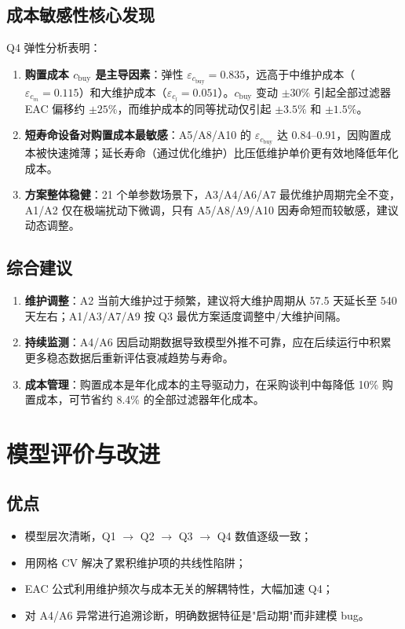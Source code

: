 \documentclass[12pt, a4paper, fontset=fandol]{ctexart}
\theoremstyle{definition}
\begin{document}
\subsection{成本敏感性核心发现}

Q4 弹性分析表明：
\begin{enumerate}[leftmargin=2em]
  \item \textbf{购置成本 $c_{\text{buy}}$ 是主导因素}：弹性 $\varepsilon_{c_{\text{buy}}}=0.835$，远高于中维护成本（$\varepsilon_{c_m}=0.115$）和大维护成本（$\varepsilon_{c_l}=0.051$）。$c_{\text{buy}}$ 变动 $\pm 30\%$ 引起全部过滤器 EAC 偏移约 $\pm 25\%$，而维护成本的同等扰动仅引起 $\pm 3.5\%$ 和 $\pm 1.5\%$。
  \item \textbf{短寿命设备对购置成本最敏感}：A5/A8/A10 的 $\varepsilon_{c_{\text{buy}}}$ 达 0.84--0.91，因购置成本被快速摊薄；延长寿命（通过优化维护）比压低维护单价更有效地降低年化成本。
  \item \textbf{方案整体稳健}：21 个单参数场景下，A3/A4/A6/A7 最优维护周期完全不变，A1/A2 仅在极端扰动下微调，只有 A5/A8/A9/A10 因寿命短而较敏感，建议动态调整。
\end{enumerate}

\subsection{综合建议}

\begin{enumerate}[leftmargin=2em]
  \item \textbf{维护调整}：A2 当前大维护过于频繁，建议将大维护周期从 57.5 天延长至 540 天左右；A1/A3/A7/A9 按 Q3 最优方案适度调整中/大维护间隔。
  \item \textbf{持续监测}：A4/A6 因启动期数据导致模型外推不可靠，应在后续运行中积累更多稳态数据后重新评估衰减趋势与寿命。
  \item \textbf{成本管理}：购置成本是年化成本的主导驱动力，在采购谈判中每降低 10\% 购置成本，可节省约 8.4\% 的全部过滤器年化成本。
\end{enumerate}

\section{模型评价与改进}

\subsection{优点}
\begin{itemize}[leftmargin=2em]
  \item 模型层次清晰，Q1 $\to$ Q2 $\to$ Q3 $\to$ Q4 数值逐级一致；
  \item 用网格 CV 解决了累积维护项的共线性陷阱；
  \item EAC 公式利用维护频次与成本无关的解耦特性，大幅加速 Q4；
  \item 对 A4/A6 异常进行追溯诊断，明确数据特征是"启动期"而非建模 bug。
\end{itemize}
\end{document}
